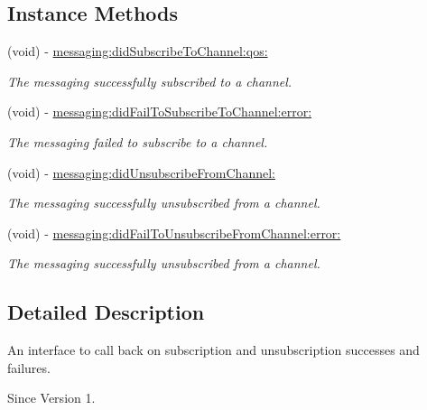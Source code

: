 \subsection*{Instance Methods}
\begin{DoxyCompactItemize}
\item 
(void) -\/ \hyperlink{protocol_x_i_messaging_subscription_listener_01-p_a5655baec5f028ddddc34bf3f103d5f2e}{messaging\+:did\+Subscribe\+To\+Channel\+:qos\+:}
\begin{DoxyCompactList}\small\item\em The messaging successfully subscribed to a channel. \end{DoxyCompactList}\item 
(void) -\/ \hyperlink{protocol_x_i_messaging_subscription_listener_01-p_a34dd688644eeef160dac1f6f1b0654fa}{messaging\+:did\+Fail\+To\+Subscribe\+To\+Channel\+:error\+:}
\begin{DoxyCompactList}\small\item\em The messaging failed to subscribe to a channel. \end{DoxyCompactList}\item 
(void) -\/ \hyperlink{protocol_x_i_messaging_subscription_listener_01-p_acaa134e9f3071ba1b7aa921583fbe6ac}{messaging\+:did\+Unsubscribe\+From\+Channel\+:}
\begin{DoxyCompactList}\small\item\em The messaging successfully unsubscribed from a channel. \end{DoxyCompactList}\item 
(void) -\/ \hyperlink{protocol_x_i_messaging_subscription_listener_01-p_a1d3fdcd676f630f81aebc74342548311}{messaging\+:did\+Fail\+To\+Unsubscribe\+From\+Channel\+:error\+:}
\begin{DoxyCompactList}\small\item\em The messaging successfully unsubscribed from a channel. \end{DoxyCompactList}\end{DoxyCompactItemize}


\subsection{Detailed Description}
An interface to call back on subscription and unsubscription successes and failures. 

\begin{DoxySince}{Since}
Version 1. 
\end{DoxySince}


